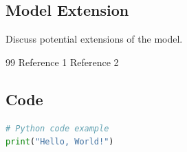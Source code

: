 \documentclass[mcmthesis]{mcmthesis}
\begin{document}
\subsection{Model Extension}
Discuss potential extensions of the model.

\begin{thebibliography}{99}
 Reference 1
 Reference 2
\end{thebibliography}

\begin{appendices}
\section{Code}
\begin{lstlisting}[language=Python]
# Python code example
print("Hello, World!")
\end{lstlisting}
\end{appendices}
\end{document}
